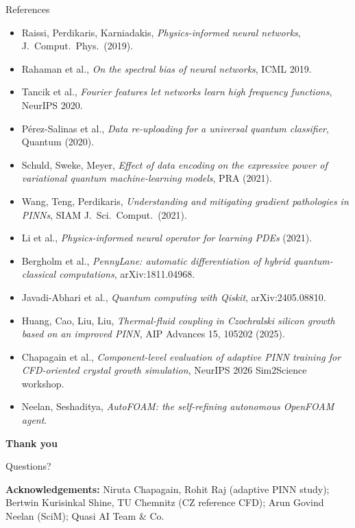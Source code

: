 \documentclass[aspectratio=169,10pt]{beamer}
\begin{document}
\begin{frame}{References}
\scriptsize
\begin{itemize}\setlength{\itemsep}{1pt}
  \item Raissi, Perdikaris, Karniadakis, \emph{Physics-informed neural networks}, J.\ Comput.\ Phys.\ (2019).
  \item Rahaman et al., \emph{On the spectral bias of neural networks}, ICML 2019.
  \item Tancik et al., \emph{Fourier features let networks learn high frequency functions}, NeurIPS 2020.
  \item P\'erez-Salinas et al., \emph{Data re-uploading for a universal quantum classifier}, Quantum (2020).
  \item Schuld, Sweke, Meyer, \emph{Effect of data encoding on the expressive power of variational quantum machine-learning models}, PRA (2021).
  \item Wang, Teng, Perdikaris, \emph{Understanding and mitigating gradient pathologies in PINNs}, SIAM J.\ Sci.\ Comput.\ (2021).
  \item Li et al., \emph{Physics-informed neural operator for learning PDEs} (2021).
  \item Bergholm et al., \emph{PennyLane: automatic differentiation of hybrid quantum-classical computations}, arXiv:1811.04968.
  \item Javadi-Abhari et al., \emph{Quantum computing with Qiskit}, arXiv:2405.08810.
  \item Huang, Cao, Liu, Liu, \emph{Thermal-fluid coupling in Czochralski silicon growth based on an improved PINN}, AIP Advances 15, 105202 (2025).
  \item Chapagain et al., \emph{Component-level evaluation of adaptive PINN training for CFD-oriented crystal growth simulation}, NeurIPS 2026 Sim2Science workshop.
  \item Neelan, Seshaditya, \emph{AutoFOAM: the self-refining autonomous OpenFOAM agent}.
\end{itemize}
\end{frame}

\begin{frame}
\centering
\Large\textbf{Thank you}

\vspace{0.3cm}
\normalsize Questions?

\vspace{0.6cm}
\footnotesize
\textbf{Acknowledgements:} Niruta Chapagain, Rohit Raj (adaptive PINN study);
Bertwin Kurisinkal Shine, TU Chemnitz (CZ reference CFD);
Arun Govind Neelan (SciM); Quasi AI Team \& Co.
\end{frame}
\end{document}
